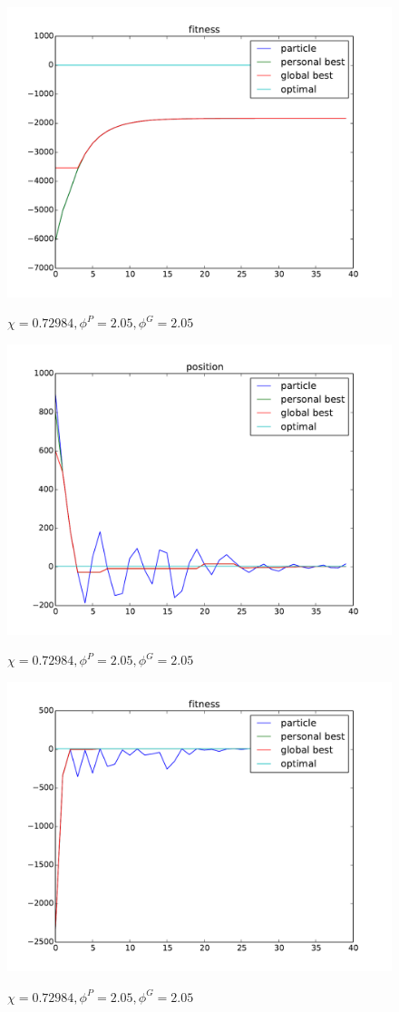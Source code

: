 \begin{figure}[ht]
\centering
\includegraphics[width=.7\linewidth]{./simfig/case1/fitness1-1} 
\label{fig:case1-1:fitness}
\caption{$ \chi = 0.72984 , \phi^{P} = 2.05 , \phi^{G} = 2.05 $ }
\end{figure}

\begin{figure}[ht]
\centering
\includegraphics[width=.7\linewidth]{./simfig/case1/position1-2} 
\label{fig:case1-2:position}
\caption{$ \chi = 0.72984 , \phi^{P} = 2.05 , \phi^{G} = 2.05 $ }
\end{figure}
  
\begin{figure}[ht]
\centering
\includegraphics[width=.7\linewidth]{./simfig/case1/fitness1-2} 
\label{fig:case1-2:fitness} 
\caption{$ \chi = 0.72984 , \phi^{P} = 2.05 , \phi^{G} = 2.05 $ }
\end{figure}

